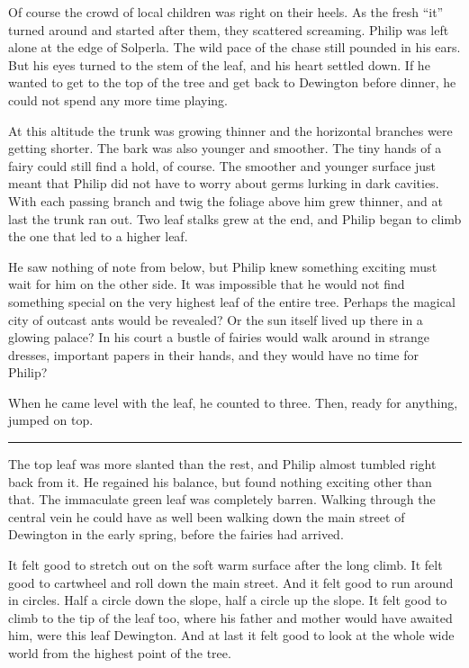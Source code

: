 \documentclass[10pt, draft]{memoir}
\renewcommand{\pfbreakdisplay}{\bigskip \ding{166} \bigskip}
\newcommand{\secbreak}{\fancybreak{\pfbreakdisplay}}
\begin{document}
Of course the crowd of local children was right on their heels. As the fresh
``it'' turned around and started after them, they scattered screaming. Philip
was left alone at the edge of Solperla. The wild pace of the chase still
pounded in his ears. But his eyes turned to the stem of the leaf, and his heart
settled down. If he wanted to get to the top of the tree and get back to
Dewington before dinner, he could not spend any more time playing.

At this altitude the trunk was growing thinner and the horizontal branches were
getting shorter. The bark was also younger and smoother. The tiny hands of a
fairy could still find a hold, of course. The smoother and younger surface just
meant that Philip did not have to worry about germs lurking in dark cavities.
With each passing branch and twig the foliage above him grew thinner, and at
last the trunk ran out. Two leaf stalks grew at the end, and Philip began to
climb the one that led to a higher leaf.

He saw nothing of note from below, but Philip knew something exciting must wait
for him on the other side. It was impossible that he would not find something
special on the very highest leaf of the entire tree. Perhaps the magical city
of outcast ants would be revealed? Or the sun itself lived up there in a
glowing palace? In his court a bustle of fairies would walk around in strange
dresses, important papers in their hands, and they would have no time for
Philip?

When he came level with the leaf, he counted to three. Then, ready for
anything, jumped on top.

\secbreak

The top leaf was more slanted than the rest, and Philip almost tumbled right
back from it. He regained his balance, but found nothing exciting other than
that. The immaculate green leaf was completely barren. Walking through the
central vein he could have as well been walking down the main street of
Dewington in the early spring, before the fairies had arrived.

It felt good to stretch out on the soft warm surface after the long climb. It
felt good to cartwheel and roll down the main street. And it felt good to run
around in circles. Half a circle down the slope, half a circle up the slope. It
felt good to climb to the tip of the leaf too, where his father and mother
would have awaited him, were this leaf Dewington. And at last it felt good to
look at the whole wide world from the highest point of the tree.
\end{document}
